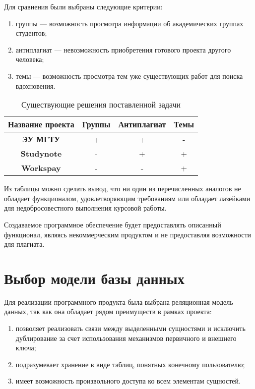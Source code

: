 Для сравнения были выбраны следующие критерии:
\begin{enumerate}
	\item группы --- возможность просмотра информации об академических группах студентов;
	\item антиплагиат --- невозможность приобретения готового проекта другого человека;
	\item темы --- возможность просмотра тем уже существующих работ для поиска вдохновения.
\end{enumerate}

\begin{table}[ht!]
	\centering
	\caption{Существующие решения поставленной задачи}
	\label{tbl:anal}
	\begin{tabular}{|c|c|c|c|}
		\hline
		\textbf{Название проекта} & \textbf{Группы} & \textbf{Антиплагиат} & \textbf{Темы}\\
		\hline
		
		\textbf{ЭУ МГТУ}& + 
		& +
		& -\\
		\hline
		
		\textbf{Studynote} & - 
		& +
		& +\\
		\hline
		
		\textbf{Workspay} & -
		& -
		& +\\
		\hline
	\end{tabular}
\end{table}

Из таблицы можно сделать вывод, что ни один из перечисленных аналогов не обладает функционалом, удовлетворяющим требованиям или обладает лазейками для недобросовестного выполнения курсовой работы.

Создаваемое программное обеспечение будет предоставлять описанный функционал, являясь некоммерческим продуктом и не предоставляя возможности для плагиата.

\section{Выбор модели базы данных}

Для реализации программного продукта была выбрана реляционная модель данных, так как она обладает рядом преимуществ в рамках проекта:

\begin{enumerate}
	\item позволяет реализовать связи между выделенными сущностями и исключить дублирование за счет использования механизмов первичного и внешнего ключа;
	\item подразумевает хранение в виде таблиц, понятных конечному пользователю;
	\item имеет возможность произвольного доступа ко всем элементам сущностей.
\end{enumerate}

